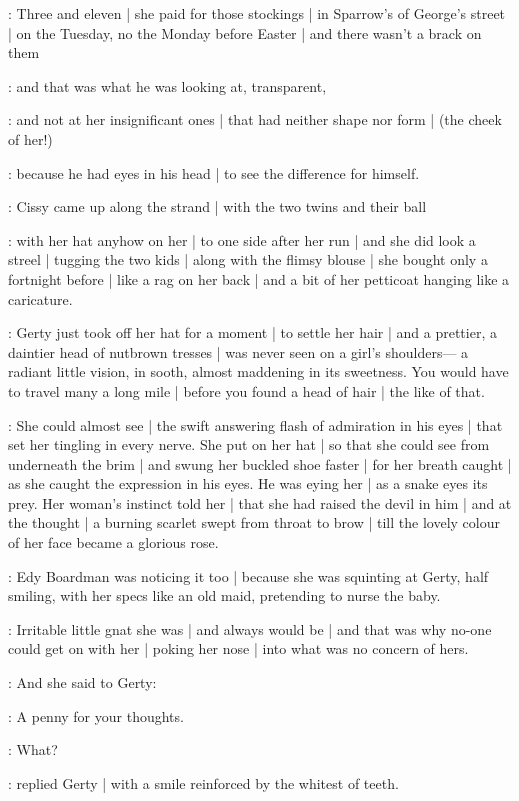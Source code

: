 \gertyReal:
Three and eleven |
she paid for those stockings |%
in Sparrow's of George's street |
on the Tuesday,
no the Monday before Easter |
and there wasn't a brack on them

\gertySex:
and that was what he was looking at,
transparent,

\gertyJudgy:
and not at her insignificant ones |
that had neither shape nor form |
(the cheek of her!)

\gertySex:
because he had eyes in his head |
to see the difference
for himself.

:
Cissy came up along the strand |
with the two twins
and their ball

\gertyJudgy:
with her hat anyhow on her |
to one side after her run |
and she did look a streel |
tugging the two kids |
along with the flimsy blouse |
she bought only a fortnight before |
like a rag on her back |
and a bit of her petticoat
hanging like a caricature.

\gertyNovel:
Gerty just took off her hat for a moment |
to settle her hair |
and a prettier,
a daintier head of nutbrown tresses |%
was never seen on a girl's shoulders—%
a radiant little vision,
in sooth,
almost maddening
in its sweetness.
You would have to travel
many a long mile |
before you found
a head of hair |
the like of that.

\gertySex:
She could almost see |
the swift answering flash of admiration in his eyes |
that set her tingling
in every nerve.
She put on her hat |
so that she could see from underneath
the brim |
and swung her buckled shoe faster |
for her breath caught |
as she caught the expression
in his eyes.
He was eying her |
as a snake eyes its prey.
Her woman's instinct told her |
that she had raised the devil in him |
and at the thought |
a burning scarlet
swept from throat to brow |
till the lovely colour of her face
became a glorious rose.%

:
Edy Boardman was noticing it too |
because she was squinting at Gerty,
half smiling,
with her specs
like an old maid,
pretending to nurse the baby.

\gertyJudgy:
Irritable little gnat she was |
and always would be |
and that was why no-one could get on with her |
poking her nose |
into what was no concern of hers.

:
And she said to Gerty:

\edy:
A penny for your thoughts.

\gerty:
What?

:
replied Gerty |
with a smile reinforced by the whitest of teeth.

